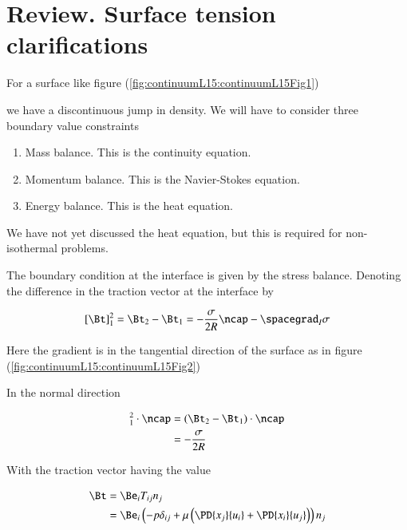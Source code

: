 \section{Review.  Surface tension clarifications}

For a surface like figure (\ref{fig:continuumL15:continuumL15Fig1})

we have a discontinuous jump in density.  We will have to consider three boundary value constraints

\begin{enumerate}
\item Mass balance.  This is the continuity equation.
\item Momentum balance.  This is the Navier-Stokes equation.
\item Energy balance.  This is the heat equation.
\end{enumerate}

We have not yet discussed the heat equation, but this is required for non-isothermal problems.

The boundary condition at the interface is given by the stress balance.  Denoting the difference in the traction vector at the interface by

\begin{equation}\label{eqn:continuumL15:130}
[\Bt]_1^2 = \Bt_2 - \Bt_1 = -\frac{\sigma}{2 R} \ncap - \spacegrad_I \sigma
\end{equation}

Here the gradient is in the tangential direction of the surface as in figure (\ref{fig:continuumL15:continuumL15Fig2})

In the normal direction

\begin{align*}
[\Bt]_1^2 \cdot \ncap
&= (\Bt_2 - \Bt_1) \cdot \ncap \\
&= -\frac{\sigma}{2 R} 
\end{align*}

With the traction vector having the value

\begin{align*}
\Bt 
&= \Be_i T_{ij} n_j \\
&= 
\Be_i \left( 
-p \delta_{ij} + \mu \left( 
\PD{x_j}{u_i}
+\PD{x_i}{u_j}
\right)
\right)
n_j
\end{align*}

